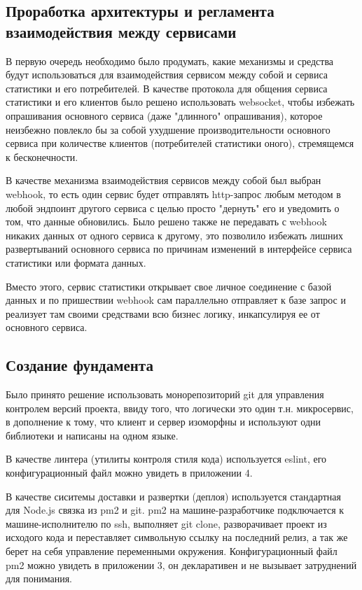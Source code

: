 \documentclass[a4paper, 12pt]{article}
\begin{document}
    \subsection*{Проработка архитектуры и регламента взаимодействия между сервисами}
    В первую очередь необходимо было продумать, какие механизмы и средства будут использоваться для взаимодействия
    сервисом между собой и сервиса статистики и его потребителей. В качестве протокола для общения сервиса статистики и его клиентов
    было решено использовать websocket, чтобы избежать опрашивания основного
    сервиса (даже "длинного" опрашивания), которое неизбежно повлекло бы за собой ухудшение производительности основного сервиса
    при количестве клиентов (потребителей статистики оного), стремящемся к бесконечности.

    В качестве механизма взаимодействия сервисов между собой был выбран webhook, то есть один сервис будет
    отправлять http-запрос любым методом в любой эндпоинт другого сервиса с целью просто "дернуть" его и уведомить
    о том, что данные обновились. Было решено также не передавать с webhook никаких данных от одного сервиса к другому,
    это позволило избежать лишних развертываний основного сервиса по причинам изменений в интерфейсе сервиса статистики или формата данных.

    Вместо этого, сервис статистики открывает свое личное соединение с базой данных и по пришествии webhook сам
    параллельно отправляет к базе запрос и реализует там своими средствами всю бизнес логику, инкапсулируя ее от основного сервиса.

    \subsection*{Создание фундамента}
    Было принято решение использовать монорепозиторий git для управления контролем версий проекта, ввиду того, что
    логически это один т.н. микросервис, в дополнение к тому, что клиент и сервер изоморфны и используют одни библиотеки
    и написаны на одном языке.

    В качестве линтера (утилиты контроля стиля кода) используется eslint, его конфигурационный файл можно увидеть в
    приложении 4.

    В качестве сиситемы доставки и развертки (деплоя) используется стандартная для Node.js связка из pm2 и git. pm2 на машине-разработчике
    подключается к машине-исполнителю по ssh, выполняет git clone, разворачивает проект из исходого кода и переставляет символьную ссылку
    на последний релиз, а так же берет на себя управление переменными окружения. Конфигурационный файл pm2 можно увидеть
    в приложении 3, он декларативен и не вызывает затруднений для понимания.
\end{document}
